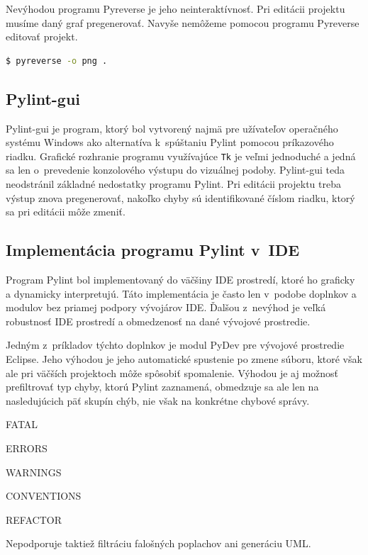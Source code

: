 \documentclass[11pt,oneside,final]{fithesis2}
\begin{document}
		Nevýhodou programu Pyreverse je jeho neinteraktívnosť. Pri editácii projektu musíme daný graf pregenerovať. Navyše nemôžeme pomocou programu Pyreverse editovať projekt.		
		
\begin{lstlisting}[language=bash]
$ pyreverse -o png .
\end{lstlisting}
 
 
	\subsection{Pylint-gui}
	
	Pylint-gui je program, ktorý bol vytvorený najmä pre užívateľov operačného systému Windows ako alternatíva k~spúštaniu Pylint pomocou príkazového riadku. Grafické rozhranie programu využívajúce \texttt{Tk} je veľmi jednoduché a jedná sa len o~prevedenie konzolového výstupu do vizuálnej podoby. Pylint-gui teda neodstránil základné nedostatky programu Pylint. Pri editácii projektu treba výstup znova pregenerovať, nakoľko chyby sú identifikované číslom riadku, ktorý sa pri editácii môže zmeniť.
	
	\subsection{Implementácia programu Pylint v~IDE}
 
	Program Pylint bol implementovaný do väčšiny IDE prostredí, ktoré ho graficky a dynamicky interpretujú. Táto implementácia je často len v~podobe doplnkov a modulov bez priamej podpory vývojárov IDE. Ďalšou z~nevýhod je veľká robustnosť IDE prostredí a obmedzenosť na dané vývojové prostredie. 
	
	Jedným z~príkladov týchto doplnkov je modul PyDev\cite{pydev} pre vývojové prostredie Eclipse. Jeho výhodou je jeho automatické spustenie po zmene súboru, ktoré však ale pri väčších projektoch môže spôsobiť spomalenie. Výhodou je aj možnosť prefiltrovať typ chyby, ktorú Pylint zaznamená, obmedzuje sa ale len na nasledujúcich päť skupín chýb, nie však na konkrétne chybové správy.

\begin{list}{•}{}
\item FATAL
\item ERRORS
\item WARNINGS
\item CONVENTIONS
\item REFACTOR
\end{list}
Nepodporuje taktiež filtráciu falošných poplachov ani generáciu UML.
	
\end{document}
